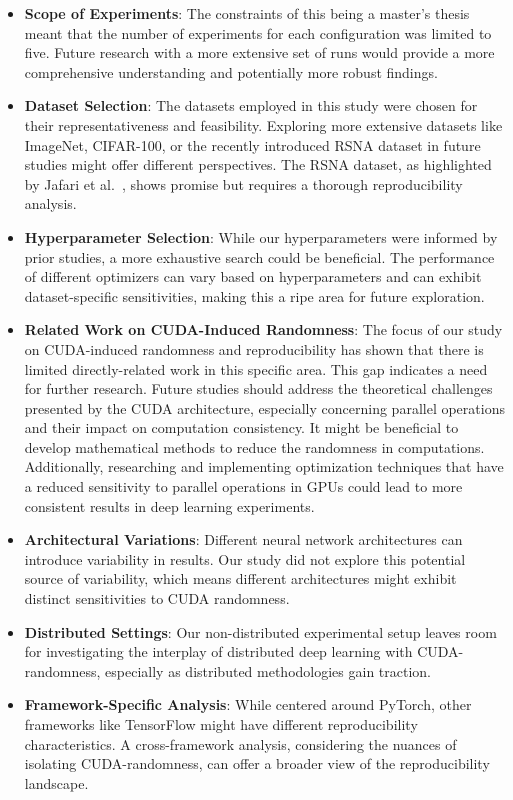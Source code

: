 \begin{itemize}
    \item \textbf{Scope of Experiments}: The constraints of this being a master's thesis meant that the number of experiments for each configuration was limited to five. Future research with a more extensive set of runs would provide a more comprehensive understanding and potentially more robust findings.
    
    \item \textbf{Dataset Selection}: The datasets employed in this study were chosen for their representativeness and feasibility. Exploring more extensive datasets like ImageNet, CIFAR-100, or the recently introduced RSNA dataset in future studies might offer different perspectives. The RSNA dataset, as highlighted by Jafari et al.~\cite{jafari2023breast}, shows promise but requires a thorough reproducibility analysis.
    
    \item \textbf{Hyperparameter Selection}: While our hyperparameters were informed by prior studies, a more exhaustive search could be beneficial. The performance of different optimizers can vary based on hyperparameters and can exhibit dataset-specific sensitivities, making this a ripe area for future exploration.
    
    \item \textbf{Related Work on CUDA-Induced Randomness}: The focus of our study on CUDA-induced randomness and reproducibility has shown that there is limited directly-related work in this specific area. This gap indicates a need for further research. Future studies should address the theoretical challenges presented by the CUDA architecture, especially concerning parallel operations and their impact on computation consistency. It might be beneficial to develop mathematical methods to reduce the randomness in computations. Additionally, researching and implementing optimization techniques that have a reduced sensitivity to parallel operations in GPUs could lead to more consistent results in deep learning experiments.
    
    \item \textbf{Architectural Variations}: Different neural network architectures can introduce variability in results. Our study did not explore this potential source of variability, which means different architectures might exhibit distinct sensitivities to CUDA randomness.
    
    \item \textbf{Distributed Settings}: Our non-distributed experimental setup leaves room for investigating the interplay of distributed deep learning with CUDA-randomness, especially as distributed methodologies gain traction.
    
    \item \textbf{Framework-Specific Analysis}: While centered around PyTorch, other frameworks like TensorFlow might have different reproducibility characteristics. A cross-framework analysis, considering the nuances of isolating CUDA-randomness, can offer a broader view of the reproducibility landscape.
\end{itemize}


